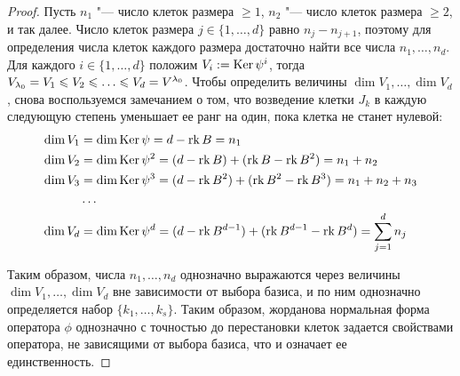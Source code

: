 \begin{proof}
	Пусть $n_1$ "--- число клеток размера $\ge 1$, $n_2$ "--- число клеток размера $\ge 2$, и так далее. Число клеток размера $j \in \{1, \dotsc, d\}$ равно $n_j - n_{j + 1}$, поэтому для определения числа клеток каждого размера достаточно найти все числа $n_1, \dotsc, n_d$. Для каждого $i \in \{1, \dotsc, d\}$ положим $V_i := \operatorname{Ker}{\psi^i}$, тогда $V_{\lambda_0} \hm{=} V_1 \le V_2 \hm{\le} \dots \hm{\le} V_d = V^{\lambda_0}$. Чтобы определить величины $\dim{V_1}, \dots, \dim{V_d}$, снова воспользуемся замечанием о том, что возведение клетки $J_k$ в каждую следующую степень уменьшает ее ранг на один, пока клетка не станет нулевой:
	\begin{align*}
		\dim{V_1} &= \dim{\operatorname{Ker}{\psi}} = d - \operatorname{rk}{B} = n_1\\
		\dim{V_2} &= \dim{\operatorname{Ker}{\psi^2}} = (d - \operatorname{rk}{B}) + (\operatorname{rk}{B} - \operatorname{rk}{B^2}) = n_1 + n_2\\
		\dim{V_3} &= \dim{\operatorname{Ker}{\psi^3}} = (d - \operatorname{rk}{B^2}) + (\operatorname{rk}{B^2} - \operatorname{rk}{B^3}) = n_1 + n_2 + n_3\\
		&\dots\\
		\dim{V_d} &= \dim{\operatorname{Ker}{\psi^d}} = (d - \operatorname{rk}{B^{d - 1}}) + (\operatorname{rk}{B^{d - 1}} - \operatorname{rk}{B^d})= \sum_{j = 1}^dn_j
	\end{align*}
	
	Таким образом, числа $n_1, \dotsc, n_d$ однозначно выражаются через величины $\dim{V_1}, \dotsc, \dim{V_d}$ вне зависимости от выбора базиса, и по ним однозначно определяется набор $\{k_1, \dots, k_s\}$. Таким образом, жорданова нормальная форма оператора $\phi$ однозначно с точностью до перестановки клеток задается свойствами оператора, не зависящими от выбора базиса, что и означает ее единственность.
\end{proof}
